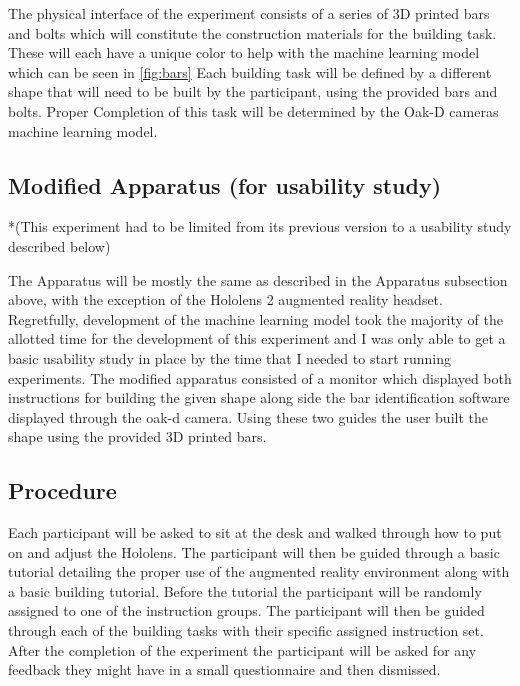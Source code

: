 \documentclass{vgtc}                          %
\begin{document}
The physical interface of the experiment consists of a series of 3D printed bars and bolts which will constitute the construction materials for the building task. These will each have a unique color to help with the machine learning model which can be seen in \autoref{fig:bars} Each building task will be defined by a different shape that will need to be built by the participant, using the provided bars and bolts. Proper Completion of this task will be determined by the Oak-D cameras machine learning model. 




\subsection{Modified Apparatus (for usability study)}

*(This experiment had to be limited from its previous version to a usability study described below)

The Apparatus will be mostly the same as described in the Apparatus subsection above, with the exception of the Hololens 2 augmented reality headset. Regretfully, development of the machine learning model took the majority of the allotted time for the development of this experiment and I was only able to get a basic usability study in place by the time that I needed to start running experiments. The modified apparatus consisted of a monitor which displayed both instructions for building the given shape along side the bar identification software displayed through the oak-d camera. Using these two guides the user built the shape using the provided 3D printed bars.



\subsection{Procedure}



Each participant will be asked to sit at the desk and walked through how to put on and adjust the Hololens. The participant will then be guided through a basic tutorial detailing the proper use of the augmented reality environment along with a basic building tutorial. Before the tutorial the participant will be randomly assigned to one of the instruction groups. The participant will then be guided through each of the building tasks with their specific assigned instruction set. After the completion of the experiment the participant will be asked for any feedback they might have in a small questionnaire and then dismissed.
\end{document}
